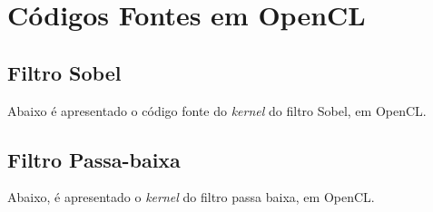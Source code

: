 \section{Códigos Fontes em OpenCL}
\subsection{Filtro Sobel}
Abaixo é apresentado o código fonte do \textit{kernel} do filtro Sobel, em OpenCL.

\newpage
\subsection{Filtro Passa-baixa}
Abaixo, é apresentado o \textit{kernel} do filtro passa baixa, em OpenCL.



